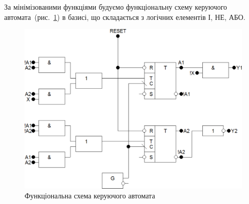 \documentclass[a4paper,oneside,DIV=12,12pt]{scrartcl}
\begin{document}
\begin{solution}
		За мінімізованими функціями будуємо функціональну схему керуючого автомата~(рис.~\ref{fig:task-5-schematic}) в базисі, що складається з логічних елементів І, НЕ, АБО.
		
		\begin{figure}[!htbp]
		\centering
			\includegraphics[height = 16\baselineskip]{../schematic-trimmed.pdf}
		\caption{Функціональна схема керуючого автомата}
		\label{fig:task-5-schematic}
		\end{figure}
	\end{solution}
\end{document}
